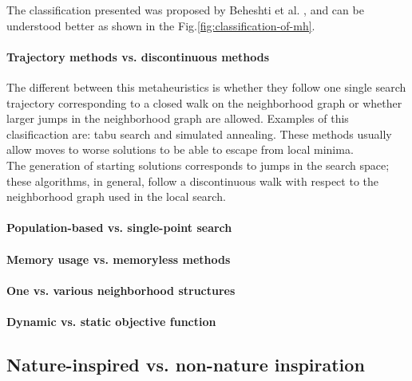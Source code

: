 The classification presented was proposed by Beheshti et al. \cite{Beheshti:2014:CCA:2563733.2564085}, and can be understood better as shown in the Fig.\ref{fig:classification-of-mh}.

\paragraph{Trajectory methods vs. discontinuous methods}
The different between this metaheuristics is whether they follow one single search trajectory
corresponding to a closed walk on the neighborhood graph or whether larger
jumps in the neighborhood graph are allowed. Examples of this clasificaction are: tabu search and simulated annealing. These methods usually allow moves to worse solutions to be able to escape from local minima.\\

The generation of starting solutions corresponds to jumps in the search space; these algorithms, in general, follow a discontinuous walk with respect to the neighborhood graph used in the local
search.
\paragraph{Population-based vs. single-point search}

\paragraph{Memory usage vs. memoryless methods}

\paragraph{One vs. various neighborhood structures}

\paragraph{Dynamic vs. static objective function}

\subsection{Nature-inspired vs. non-nature inspiration }


